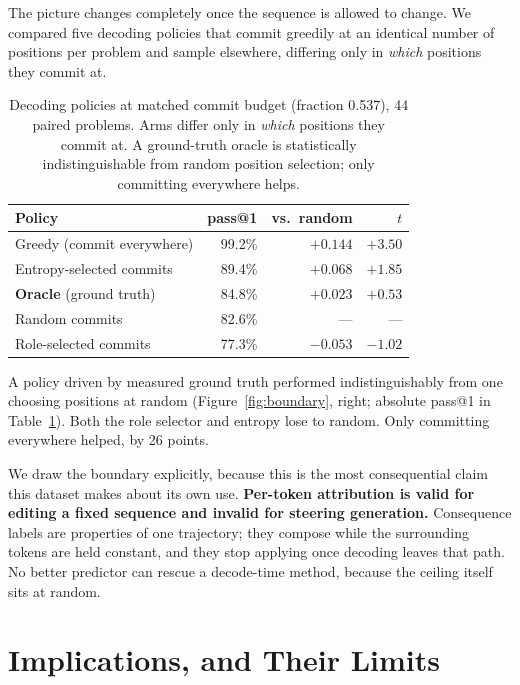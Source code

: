 \documentclass[twoside,11pt]{article}
\begin{document}
The picture changes completely once the sequence is allowed to change. We compared five decoding
policies that commit greedily at an identical number of positions per problem and sample elsewhere,
differing only in \emph{which} positions they commit at.

\begin{table}[h]
\centering\small
\begin{tabular}{lrrr}
\toprule
Policy & pass@1 & vs.\ random & $t$ \\
\midrule
Greedy (commit everywhere)      & 99.2\% & $+0.144$ & $+3.50$ \\
Entropy-selected commits        & 89.4\% & $+0.068$ & $+1.85$ \\
\textbf{Oracle} (ground truth)  & 84.8\% & $\mathbf{+0.023}$ & $\mathbf{+0.53}$ \\
Random commits                  & 82.6\% & --- & --- \\
Role-selected commits           & 77.3\% & $-0.053$ & $-1.02$ \\
\bottomrule
\end{tabular}
\caption{Decoding policies at matched commit budget (fraction 0.537), 44 paired problems. Arms
differ only in \emph{which} positions they commit at. A ground-truth oracle is statistically
indistinguishable from random position selection; only committing everywhere helps.}
\label{tab:decoding}
\end{table}

A policy driven by measured ground truth performed
indistinguishably from one choosing positions at random (Figure~\ref{fig:boundary}, right;
absolute pass@1 in Table~\ref{tab:decoding}). Both the role selector and entropy lose to random. Only committing
everywhere helped, by 26 points.

We draw the boundary explicitly, because this is the most consequential claim this dataset makes about
its own use. \textbf{Per-token attribution is valid for editing a fixed sequence and invalid for
steering generation.} Consequence labels are properties of one trajectory; they compose while the
surrounding tokens are held constant, and they stop applying once decoding leaves that path. No
better predictor can rescue a decode-time method, because the ceiling itself sits at random.

\section{Implications, and Their Limits}
\label{sec:implications}
\end{document}
